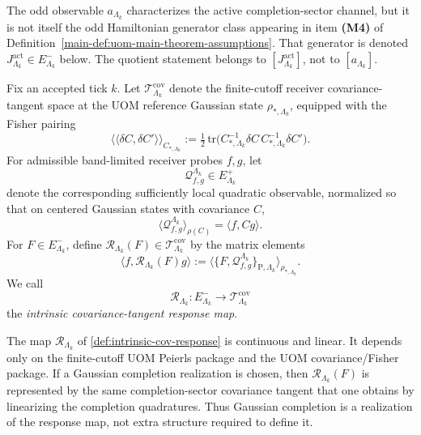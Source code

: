 \documentclass[11pt]{article}
\begin{document}
\begin{remark}
\label{rem:a-vs-Jact}
The odd observable \(a_{\Lambda_k}\) characterizes the active completion-sector channel, but it is
not itself the odd Hamiltonian generator class appearing in item \textbf{(M4)} of
Definition~\ref{main-def:uom-main-theorem-assumptions}.
That generator is denoted \(J^{\mathrm{act}}_{\Lambda_k}\in E^-_{\Lambda_k}\) below.
The quotient statement belongs to \([J^{\mathrm{act}}_{\Lambda_k}]\), not to
\([a_{\Lambda_k}]\).
\end{remark}

\begin{definition}
\label{def:intrinsic-cov-response}
Fix an accepted tick \(k\). Let \(\mathcal T^{\mathrm{cov}}_{\Lambda_k}\) denote the finite-cutoff
receiver covariance-tangent space at the UOM reference Gaussian state
\(\rho_{\ast,\Lambda_k}\), equipped with the Fisher pairing
\[
\big\langle\!\big\langle \delta C,\delta C'\big\rangle\!\big\rangle_{C_{\ast,\Lambda_k}}
:=
\tfrac12\,\mathrm{tr}\!\big(
C_{\ast,\Lambda_k}^{-1}\delta C\,C_{\ast,\Lambda_k}^{-1}\delta C'
\big).
\]
For admissible band-limited receiver probes \(f,g\), let
\[
\mathcal Q^{\Lambda_k}_{f,g}\in E^+_{\Lambda_k}
\]
denote the corresponding sufficiently local quadratic observable, normalized so that on centered
Gaussian states with covariance \(C\),
\[
\big\langle \mathcal Q^{\Lambda_k}_{f,g}\big\rangle_{\rho(C)}
=
\langle f,Cg\rangle.
\]
For \(F\in E^-_{\Lambda_k}\), define \(\mathcal R_{\Lambda_k}(F)\in\mathcal T^{\mathrm{cov}}_{\Lambda_k}\)
by the matrix elements
\[
\big\langle f,\mathcal R_{\Lambda_k}(F)g\big\rangle
:=
\Big\langle
\{F,\mathcal Q^{\Lambda_k}_{f,g}\}_{\mathrm P,\Lambda_k}
\Big\rangle_{\rho_{\ast,\Lambda_k}}.
\]
We call
\[
\mathcal R_{\Lambda_k}:E^-_{\Lambda_k}\to\mathcal T^{\mathrm{cov}}_{\Lambda_k}
\]
the \emph{intrinsic covariance-tangent response map}.
\end{definition}

\begin{proposition}
\label{prop:intrinsic-cov-response}
The map \(\mathcal R_{\Lambda_k}\) of \cref{def:intrinsic-cov-response} is continuous and linear.
It depends only on the finite-cutoff UOM Peierls package and the UOM covariance/Fisher package.
If a Gaussian completion realization is chosen, then \(\mathcal R_{\Lambda_k}(F)\) is represented by
the same completion-sector covariance tangent that one obtains by linearizing the completion
quadratures. Thus Gaussian completion is a realization of the response map, not extra structure
required to define it.
\end{proposition}
\end{document}
